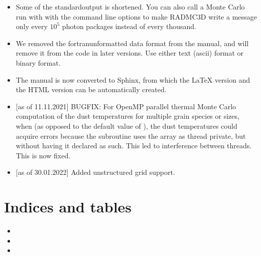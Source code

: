 \documentclass[letterpaper,10pt,english]{sphinxmanual}
\begin{document}
\begin{itemize}
\begin{itemize}
\item {} 
Some of the standard\sphinxhyphen{}output is shortened. You can also call a
Monte Carlo run with  with the command line
options  to make RADMC\sphinxhyphen{}3D write a
message only every \(10^5\) photon packages instead of every thousand.

\item {} 
We removed the fortran\sphinxhyphen{}unformatted data format from the manual,
and will remove it from the code in later versions. Use either text
(ascii) format or binary format.

\item {} 
The manual is now converted to Sphinx, from which the LaTeX version
and the HTML version can be automatically created.

\item {} 
{[}as of 11.11.2021{]} BUGFIX: For OpenMP parallel thermal Monte Carlo
computation of the dust temperatures for multiple grain species or
sizes, when  (as opposed to the default value of
), the dust temperatures could acquire errors
because the  subroutine uses the array
 as thread private, but without having it declared
as such. This led to interference between threads. This is now
fixed.

\item {} 
{[}as of 30.01.2022{]} Added unstructured grid support.

\end{itemize}

\end{itemize}


\chapter{Indices and tables}
\label{\detokenize{index:indices-and-tables}}\begin{itemize}
\item {} 

\item {} 

\item {} 

\end{itemize}



\renewcommand{\indexname}{Index}
\printindex
\end{document}
